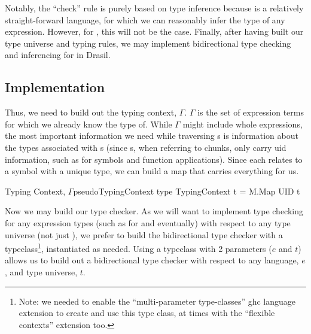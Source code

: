 Notably, the ``check'' rule is purely based on type inference because \Expr{} is
a relatively straight-forward language, for which we can reasonably infer the
type of any expression. However, for \ModelExpr{}, this will not be the case.
Finally, after having built our type universe and typing rules, we may implement
bidirectional type checking and inferencing for \Expr{} in Drasil.

\subsection{Implementation}
\label{chap:typed-expr:sec:typing-the-expression-language:subsec:implementation}


Thus, we need to build out the typing context, \(\Gamma\). \(\Gamma\) is the set
of expression terms for which we already know the type of. While \(\Gamma\)
might include whole expressions, the most important information we need while
traversing \Expr{}s is information about the types associated with \UID{}s
(since \Expr{}s, when referring to chunks, only carry \acs{uid} information,
such as for symbols and function applications). Since each \UID{} relates to a
symbol with a unique type, we can build a map that carries everything for us.

\begin{pseudohaskell}{Typing Context, \(\Gamma\)}{pseudoTypingContext}
type TypingContext t = M.Map UID t
\end{pseudohaskell}

Now we may build our type checker. As we will want to implement type checking
for any expression types (such as for \CodeExpr{} and \ModelExpr{} eventually)
with respect to any type universe (not just \Space{}), we prefer to build the
bidirectional type checker with a typeclass\footnote{Note: we needed to enable
the ``multi-parameter type-classes'' \cite{GHC2020MultiParamTypeClasses}
\acs{ghc} language extension to create and use this type class, at times with
the ``flexible contexts'' \cite{GHC2020FlexibleContexts} extension too.},
instantiated as needed. Using a typeclass with 2 parameters (\(e\) and \(t\))
allows us to build out a bidirectional type checker with respect to any
language, \(e\), and type universe, \(t\).

